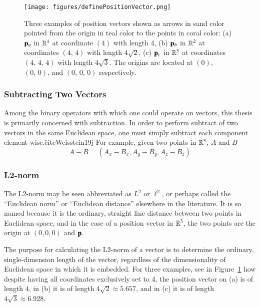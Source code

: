 \begin{figure}[ht]
\ffigbox
	{\texttt{[image: figures/definePositionVector.png]}}
	{\caption[Examples of Position Vector]{Three examples of position vectors shown as arrows in sand color pointed from the origin in teal color to the points in coral color: (a) $\mathbf{p}_a$ in $\mathbb{R}^{1}$ at coordinate $(4)$ with length 4, (b) $\mathbf{p}_b$ in $\mathbb{R}^{2}$ at coordinates $(4,\,4)$ with length $4\sqrt{2}$, (c) $\mathbf{p}_c$ in $\mathbb{R}^{3}$ at coordinates $(4,\,4,\,4)$ with length $4\sqrt{3}$. The origins are located at $(0)$, $(0,\,0)$, and $(0,\,0,\,0)$ respectively.}\label{fig:definePositionVector}}
\end{figure}

%
\subsubsection{Subtracting Two Vectors}
\label{ch2sBssLAsssS2V}
Among the binary operators with which one could operate on vectors, this thesis is primarily concerned with subtraction. In order to perform subtract of two vectors in the same Euclidean space, one must simply subtract each component element-wise.\~cite{Weisstein19j} For example, given two points in $\mathbb{R}^{3}$, $A$ and $B$
\begin{equation}
	A - B = (A_x - B_x, A_y - B_y, A_z - B_z)
	\label{eq:vectorSubtraction}
\end{equation}

%
\subsubsection{L2-norm}
\label{ch2sBssLAsssL2N}
The L2-norm may be seen abbreviated as $L^2$ or $\ell^2$, or perhaps called the ``Euclidean norm'' or ``Euclidean distance'' elsewhere in the literature. It is so named because it is the ordinary, straight line distance between two points in Euclidean space, and in the case of a position vector in $\mathbb{R}^{3}$, the two points are the origin at $(0, 0, 0)$ and $\mathbf{p}$.~\cite{Weisstein19h}

The purpose for calculating the L2-norm of a vector is to determine the ordinary, single-dimension length of the vector, regardless of the dimensionality of Euclidean space in which it is embedded. For three examples, see in Figure~\ref{fig:definePositionVector} how despite having all coordinates exclusively set to $4$, the position vector on (a) is of length $4$, in (b) it is of length $4\sqrt{2} \approx 5.657$, and in (c) it is of length $4\sqrt{3} \approx 6.928$.

